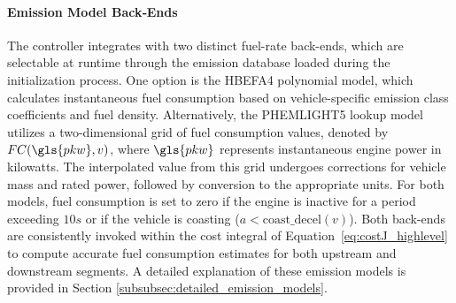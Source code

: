 \paragraph{Emission Model Back‐Ends}
\label{par:Emission_Model_BackEnd}
The controller integrates with two distinct fuel-rate back-ends, which are selectable at runtime through the emission database loaded during the initialization process. One option is the HBEFA4 polynomial model, which calculates instantaneous fuel consumption based on vehicle-specific emission class coefficients and fuel density. Alternatively, the PHEMLIGHT5 lookup model utilizes a two-dimensional grid of fuel consumption values, denoted by $FC(\gls{pkw},v)$, where $\gls{pkw}$ represents instantaneous engine power in kilowatts. The interpolated value from this grid undergoes corrections for vehicle mass and rated power, followed by conversion to the appropriate units. For both models, fuel consumption is set to zero if the engine is inactive for a period exceeding $10\unit{s}$ or if the vehicle is coasting ($a < \text{coast\_decel}(v)$). Both back-ends are consistently invoked within the cost integral of Equation~\vref{eq:costJ_highlevel} to compute accurate fuel consumption estimates for both upstream and downstream segments. A detailed explanation of these emission models is provided in Section \vref{subsubsec:detailed_emission_models}.